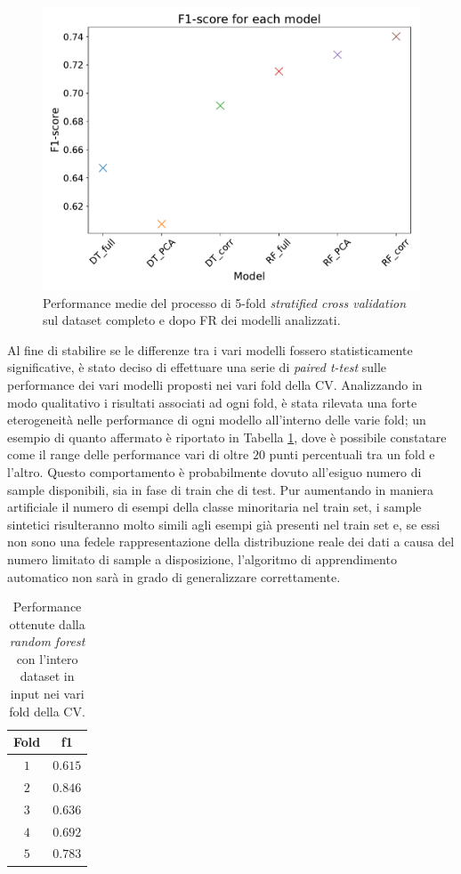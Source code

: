 \begin{figure}
	\centering
	\includegraphics[width=1\linewidth]{images/fscore}
	\caption{Performance medie del processo di 5-fold \textit{stratified cross validation} sul dataset completo e dopo FR dei modelli analizzati.}
	\label{fig:fscore}
\end{figure}
Al fine di stabilire se le differenze tra i vari modelli fossero statisticamente significative, è stato deciso di effettuare una serie di \textit{paired t-test} sulle performance dei vari modelli proposti nei vari fold della CV.
Analizzando in modo qualitativo i risultati associati ad ogni fold, è stata rilevata una forte eterogeneità nelle performance di ogni modello all'interno delle varie fold; un esempio di quanto affermato è riportato in Tabella \ref{tab:f1fold}, dove è possibile constatare come il range delle performance vari di oltre $20$ punti percentuali tra un fold e l'altro. Questo comportamento è probabilmente dovuto all'esiguo numero di sample disponibili, sia in fase di train che di test. Pur aumentando in maniera artificiale il numero di esempi della classe minoritaria nel train set, i sample sintetici risulteranno molto simili agli esempi già presenti nel train set e, se essi non sono una fedele rappresentazione della distribuzione reale dei dati a causa del numero limitato di sample a disposizione, l'algoritmo di apprendimento automatico non sarà in grado di generalizzare correttamente. 
\begin{table}
	\centering
	\caption{Performance ottenute dalla \textit{random forest} con l'intero dataset in input nei vari fold della CV.}
	\label{tab:f1fold}
	\begin{tabular}{|c|c|}
		\hline 
		Fold & f1 \\ 
		\hline 
		$1$ & $0.615$ \\ 
		\hline 
		$2$ & $0.846$ \\ 
		\hline 
		$3$ & $0.636$ \\ 
		\hline 
		$4$ & $0.692$ \\ 
		\hline 
		$5$ & $0.783$ \\ 
		\hline 
	\end{tabular} 
\end{table}
